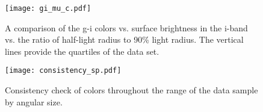 \documentclass[12pt,preprint,pdftex]{aastex}
\begin{document}
\begin{figure}
\centering
\texttt{[image: gi\_mu\_c.pdf]}
\caption{A comparison of the g-i colors vs. surface brightness in the i-band vs. the ratio of half-light radius to 90\% light radius. The vertical lines provide the quartiles of the data set.}
\end{figure}

\begin{figure}
\centering
\texttt{[image: consistency\_sp.pdf]}
\caption{Consistency check of colors throughout the range of the data sample by angular size.}
\end{figure}
\end{document}
